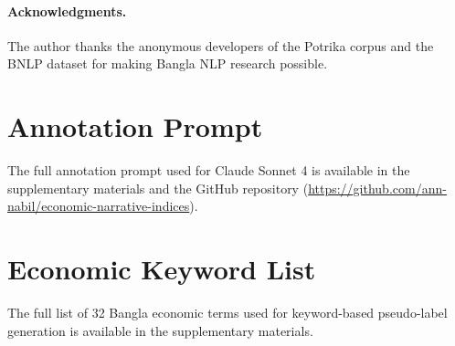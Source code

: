 \documentclass[11pt]{article}
\begin{document}


\paragraph{Acknowledgments.}
The author thanks the anonymous developers of the Potrika corpus and the BNLP dataset for making Bangla NLP research possible.




\appendix
\section{Annotation Prompt}\label{app:annotation-prompt}

The full annotation prompt used for Claude Sonnet 4 is available in the supplementary materials and the GitHub repository (\url{https://github.com/ann-nabil/economic-narrative-indices}).

\section{Economic Keyword List}\label{app:keywords}

The full list of 32 Bangla economic terms used for keyword-based pseudo-label generation is available in the supplementary materials.
\end{document}
